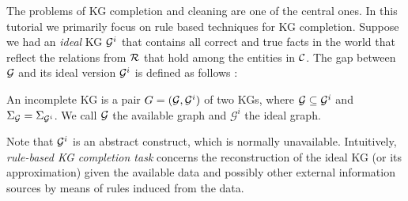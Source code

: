 


The problems of KG completion and cleaning are one of the central ones. In this tutorial we primarily focus on rule based techniques for KG completion.
Suppose we had an \emph{ideal} KG $\mathcal{G}^i$ that contains all correct and true facts in the world that reflect the relations from $\mathcal{R}$ that hold among the entities in $\mathcal{C}$. The gap between $\mathcal{G}$ and its ideal version $\mathcal{G}^i$ is defined as follows \cite{rdfcomp}: 

\begin{definition} An incomplete KG is a pair
    $G = (\mathcal{G}, \mathcal{G}^i)$ of two KGs, where $\mathcal{G}\subseteq \mathcal{G}^i$ and
    $\Sigma_{\mathcal{G}}=\Sigma_{\mathcal{G}^i}$. We call $\mathcal{G}$ the available
    graph and $\mathcal{G}^i$ the ideal graph.  \end{definition}
    
Note that $\mathcal{G}^i$ is an abstract construct, which is normally unavailable. Intuitively, \emph{rule-based KG completion task} concerns the reconstruction of the ideal KG (or its approximation) given the available data and possibly other external information sources by means of rules induced from the data.


